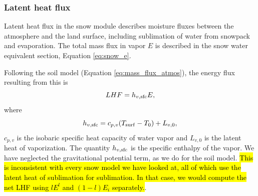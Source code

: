 \documentclass[twoside,10pt]{report}
\begin{document}
\subsubsection{Latent heat flux}
Latent heat flux in the snow module describes moisture fluxes between the atmosphere and the land surface, including sublimation of water from snowpack and evaporation. The total mass flux in vapor $E$ is described in the snow water equivalent section, Equation \eqref{eq:snow_e}.

Following the soil model (Equation \eqref{eq:mass_flux_atmos}), the energy flux resulting from this is
\begin{equation}
    LHF = h_{v, \rm sfc} E,
\end{equation}
where
\begin{equation}
    h_{v, \rm sfc} = c_{p,v} (T_{\rm surf}-T_0) + L_{v,0},
\end{equation}
$c_{p,v}$ is the isobaric specific heat capacity of water vapor and $L_{v,0}$ is the latent heat of vaporization. The quantity $h_{v, \rm sfc}$ is the specific enthalpy of the vapor. We have neglected the gravitational potential term, as we do for the soil model. \hl{This is inconsistent with every snow model we have looked at, all of which use the latent heat of sublimation for sublimation. In that case, we would compute the net LHF using $lE^l$ and $(1-l)E_i$ separately.}. 


\end{document}
